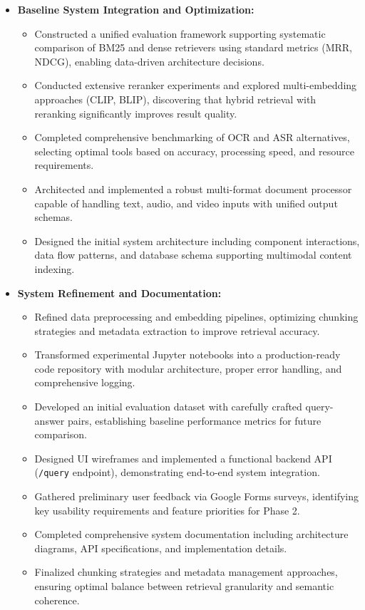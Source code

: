 \begin{itemize}
    \item \textbf{Baseline System Integration and Optimization:}
    \begin{itemize}
        \item Constructed a unified evaluation framework supporting systematic comparison of BM25 and dense retrievers using standard metrics (MRR, NDCG), enabling data-driven architecture decisions.
        \item Conducted extensive reranker experiments and explored multi-embedding approaches (CLIP, BLIP), discovering that hybrid retrieval with reranking significantly improves result quality.
        \item Completed comprehensive benchmarking of OCR and ASR alternatives, selecting optimal tools based on accuracy, processing speed, and resource requirements.
        \item Architected and implemented a robust multi-format document processor capable of handling text, audio, and video inputs with unified output schemas.
        \item Designed the initial system architecture including component interactions, data flow patterns, and database schema supporting multimodal content indexing.
    \end{itemize}

    \item \textbf{System Refinement and Documentation:}
    \begin{itemize}
        \item Refined data preprocessing and embedding pipelines, optimizing chunking strategies and metadata extraction to improve retrieval accuracy.
        \item Transformed experimental Jupyter notebooks into a production-ready code repository with modular architecture, proper error handling, and comprehensive logging.
        \item Developed an initial evaluation dataset with carefully crafted query-answer pairs, establishing baseline performance metrics for future comparison.
        \item Designed UI wireframes and implemented a functional backend API (\texttt{/query} endpoint), demonstrating end-to-end system integration.
        \item Gathered preliminary user feedback via Google Forms surveys, identifying key usability requirements and feature priorities for Phase 2.
        \item Completed comprehensive system documentation including architecture diagrams, API specifications, and implementation details.
        \item Finalized chunking strategies and metadata management approaches, ensuring optimal balance between retrieval granularity and semantic coherence.
    \end{itemize}
\end{itemize}

